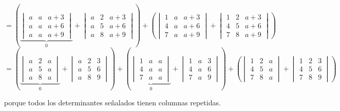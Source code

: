 \documentclass[a4paper,12pt]{article}
\begin{document}
\begin{ejercicio}[title=Ejercicio 33]
\[
=
\left(
\underbrace{
\begin{vmatrix}
a & a & a+3\\
a & a & a+6\\
a & a & a+9
\end{vmatrix}
}_{0}
+
\begin{vmatrix}
a & 2 & a+3\\
a & 5 & a+6\\
a & 8 & a+9
\end{vmatrix}
\right)
+
\left(
\begin{vmatrix}
1 & a & a+3\\
4 & a & a+6\\
7 & a & a+9
\end{vmatrix}
+
\begin{vmatrix}
1 & 2 & a+3\\
4 & 5 & a+6\\
7 & 8 & a+9
\end{vmatrix}
\right)
\]
\[
=
\left(
\underbrace{
\begin{vmatrix}
a & 2 & a\\
a & 5 & a\\
a & 8 & a
\end{vmatrix}
}_{0}
+
\begin{vmatrix}
a & 2 & 3\\
a & 5 & 6\\
a & 8 & 9
\end{vmatrix}
\right)
+
\left(
\underbrace{
\begin{vmatrix}
1 & a & a\\
4 & a & a\\
7 & a & a
\end{vmatrix}
}_{0}
+
\begin{vmatrix}
1 & a & 3\\
4 & a & 6\\
7 & a & 9
\end{vmatrix}
\right)
+
\left(
\begin{vmatrix}
1 & 2 & a\\
4 & 5 & a\\
7 & 8 & a
\end{vmatrix}
+
\begin{vmatrix}
1 & 2 & 3\\
4 & 5 & 6\\
7 & 8 & 9
\end{vmatrix}
\right)
\]

porque todos los determinantes señalados tienen columnas repetidas.
\end{ejercicio}
\end{document}
